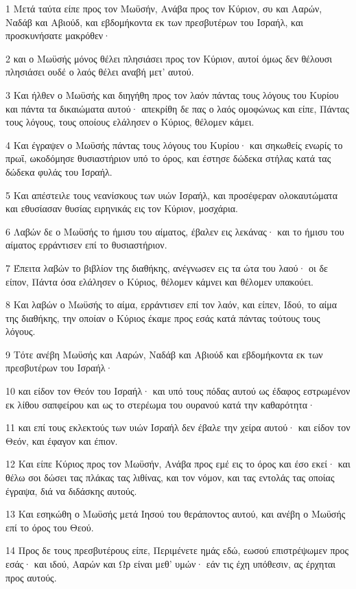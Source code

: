 \par 1 Μετά ταύτα είπε προς τον Μωϋσήν, Ανάβα προς τον Κύριον, συ και Ααρών, Ναδάβ και Αβιούδ, και εβδομήκοντα εκ των πρεσβυτέρων του Ισραήλ, και προσκυνήσατε μακρόθεν·
\par 2 και ο Μωϋσής μόνος θέλει πλησιάσει προς τον Κύριον, αυτοί όμως δεν θέλουσι πλησιάσει ουδέ ο λαός θέλει αναβή μετ' αυτού.
\par 3 Και ήλθεν ο Μωϋσής και διηγήθη προς τον λαόν πάντας τους λόγους του Κυρίου και πάντα τα δικαιώματα αυτού· απεκρίθη δε πας ο λαός ομοφώνως και είπε, Πάντας τους λόγους, τους οποίους ελάλησεν ο Κύριος, θέλομεν κάμει.
\par 4 Και έγραψεν ο Μωϋσής πάντας τους λόγους του Κυρίου· και σηκωθείς ενωρίς το πρωΐ, ωκοδόμησε θυσιαστήριον υπό το όρος, και έστησε δώδεκα στήλας κατά τας δώδεκα φυλάς του Ισραήλ.
\par 5 Και απέστειλε τους νεανίσκους των υιών Ισραήλ, και προσέφεραν ολοκαυτώματα και εθυσίασαν θυσίας ειρηνικάς εις τον Κύριον, μοσχάρια.
\par 6 Λαβών δε ο Μωϋσής το ήμισυ του αίματος, έβαλεν εις λεκάνας· και το ήμισυ του αίματος ερράντισεν επί το θυσιαστήριον.
\par 7 Έπειτα λαβών το βιβλίον της διαθήκης, ανέγνωσεν εις τα ώτα του λαού· οι δε είπον, Πάντα όσα ελάλησεν ο Κύριος, θέλομεν κάμνει και θέλομεν υπακούει.
\par 8 Και λαβών ο Μωϋσής το αίμα, ερράντισεν επί τον λαόν, και είπεν, Ιδού, το αίμα της διαθήκης, την οποίαν ο Κύριος έκαμε προς εσάς κατά πάντας τούτους τους λόγους.
\par 9 Τότε ανέβη Μωϋσής και Ααρών, Ναδάβ και Αβιούδ και εβδομήκοντα εκ των πρεσβυτέρων του Ισραήλ·
\par 10 και είδον τον Θεόν του Ισραήλ· και υπό τους πόδας αυτού ως έδαφος εστρωμένον εκ λίθου σαπφείρου και ως το στερέωμα του ουρανού κατά την καθαρότητα·
\par 11 και επί τους εκλεκτούς των υιών Ισραήλ δεν έβαλε την χείρα αυτού· και είδον τον Θεόν, και έφαγον και έπιον.
\par 12 Και είπε Κύριος προς τον Μωϋσήν, Ανάβα προς εμέ εις το όρος και έσο εκεί· και θέλω σοι δώσει τας πλάκας τας λιθίνας, και τον νόμον, και τας εντολάς τας οποίας έγραψα, διά να διδάσκης αυτούς.
\par 13 Και εσηκώθη ο Μωϋσής μετά Ιησού του θεράποντος αυτού, και ανέβη ο Μωϋσής επί το όρος του Θεού.
\par 14 Προς δε τους πρεσβυτέρους είπε, Περιμένετε ημάς εδώ, εωσού επιστρέψωμεν προς εσάς· και ιδού, Ααρών και Ωρ είναι μεθ' υμών· εάν τις έχη υπόθεσιν, ας έρχηται προς αυτούς.
